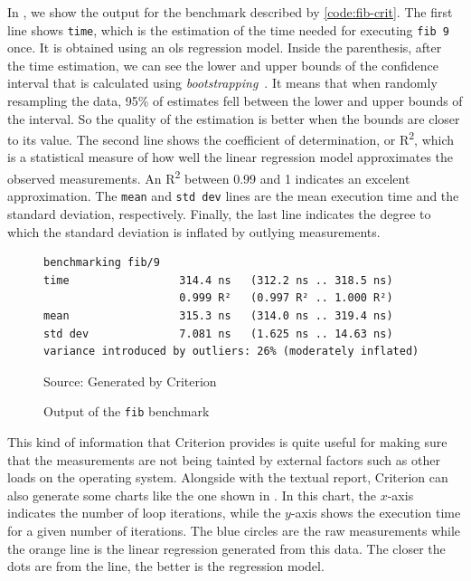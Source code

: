 In , we show the output for the benchmark described by \autoref{code:fib-crit}. The first line shows \texttt{time}, which is the estimation of the time needed for executing \texttt{fib 9} once. It is obtained using an \ac{ols} regression model. Inside the parenthesis, after the time estimation, we can see the lower and upper bounds of the confidence interval that is calculated using \emph{bootstrapping}~\citep{davison:1997}. It means that when randomly resampling the data, 95\% of estimates fell between the lower and upper bounds of the interval. So the quality of the estimation is better when the bounds are closer to its value. The second line shows the coefficient of determination, or R\textsuperscript{2}, which is a statistical measure of how well the linear regression model approximates the observed measurements. An R\textsuperscript{2} between 0.99 and 1 indicates an excelent approximation. The \texttt{mean} and \texttt{std dev} lines are the mean execution time and the standard deviation, respectively. Finally, the last line indicates the degree to which the standard deviation is inflated by outlying measurements.

\begin{figure}[htp]
  \centering
  \caption{Output of the \texttt{fib} benchmark}
  \begin{verbatim}
benchmarking fib/9
time                 314.4 ns   (312.2 ns .. 318.5 ns)
                     0.999 R²   (0.997 R² .. 1.000 R²)
mean                 315.3 ns   (314.0 ns .. 319.4 ns)
std dev              7.081 ns   (1.625 ns .. 14.63 ns)
variance introduced by outliers: 26% (moderately inflated)
  \end{verbatim}
  \footnotesize{Source: Generated by Criterion}
  \label{fig:fib-output}
\end{figure}

This kind of information that Criterion provides is quite useful for making sure that the measurements are not being tainted by external factors such as other loads on the operating system. Alongside with the textual report, Criterion can also generate some charts like the one shown in . In this chart, the $x$-axis indicates the number of loop iterations, while the $y$-axis shows the execution time for a given number of iterations. The blue circles are the raw measurements while the orange line is the linear regression generated from this data. The closer the dots are from the line, the better is the regression model.


